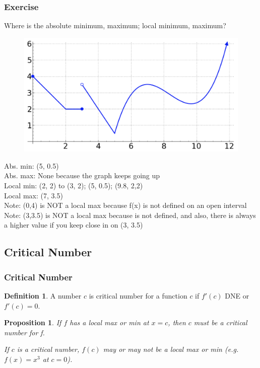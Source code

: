 \documentclass[t]{beamer}
\theoremstyle{plain}
\newtheorem{prop}{Proposition}
\theoremstyle{definition}
\newtheorem{dfn}{Definition}
\begin{document}
\begin{frame}

\frametitle{Exercise}

\footnotesize

Where is the absolute minimum, maximum;  local minimum, maximum?

\begin{figure}[t]
\begin{center}
\includegraphics[scale=0.25]{fig/maxima2}
\end{center}
\end{figure}

\pause

Abs. min: (5, 0.5)\\
Abs. max: None because the graph keeps going up\\
Local min: (2, 2) to (3, 2);  (5, 0.5);  (9.8, 2,2)\\
Local max: (7, 3.5)\\
Note: (0,4) is NOT a local max because f(x) is not defined on an open interval \\
Note: (3,3.5) is NOT a local max because is not defined, and also, there is always a higher value if you keep close in on (3, 3.5)\\

\end{frame}

\subsection{Critical Number}

\begin{frame}

\frametitle{Critical Number}

\begin{dfn}
A number $c$ is critical number for a function $c$ if $f'(c)$ DNE or $f'(c) = 0$.
\end{dfn}

\begin{prop}
If $f$ has a local max or min at $x=c$, then $c$ must be a critical number for f. 

\vspace{1em}

If $c$ is a critical number, $f(c)$ may or may not be a local max or min (e.g.  $f(x) = x^3$ at $c=0$).
\end{prop}

\end{frame}
\end{document}
